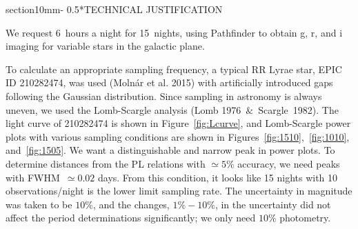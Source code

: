 \documentclass[letterpaper,11pt]{article}
\makeatletter
\renewcommand{\section}{\@startsection%
{section}{1}{0mm}{-\baselineskip}%
{0.5\baselineskip}{\normalfont\Large\bfseries}}%
\makeatother
\begin{document}
\noindent{}




\clearpage
\section*{TECHNICAL JUSTIFICATION}


We request 6~hours a night for 15~nights, using Pathfinder to obtain g, r, and i imaging for variable stars in the galactic plane.

\vspace{3mm} %

\noindent To calculate an appropriate sampling frequency, a typical RR Lyrae star, EPIC ID 210282474, was used (Molnár et al. 2015) with artificially introduced gaps following the Gaussian distribution. Since sampling in astronomy is always uneven, we used the Lomb-Scargle analysis (Lomb 1976~$\&$~Scargle~1982). The light curve of 210282474 is shown in Figure~\ref{fig:Lcurve}, and Lomb-Scargle power plots with various sampling conditions are shown in Figures~\ref{fig:1510},~\ref{fig:1010}, and~\ref{fig:1505}. We want a distinguishable and narrow peak in power plots. To determine distances from the PL relations with $\simeq5\%$ accuracy, we need peaks with FWHM~$ \simeq 0.02$ days. From this condition, it looks like 15 nights with 10 observations/night is the lower limit sampling rate. The uncertainty in magnitude was taken to be $10\%$, and the changes, $1\% - 10\%$, in the uncertainty did not affect the period determinations significantly; we only need $10\%$ photometry.
\end{document}
